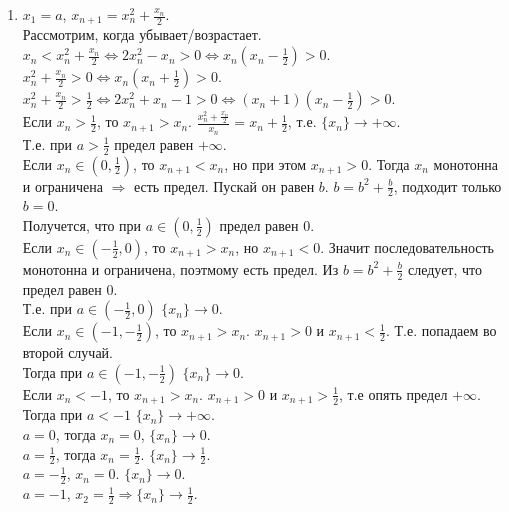 \documentclass[a4paper]{article}
\begin{document}
\begin{enumerate}
    \item $x_1 = a$, $x_{n+1} = x_n^2 + \frac{x_n}{2}$.\\
    Рассмотрим, когда убывает/возрастает.\\
    $x_n < x_n^2 + \frac{x_n}{2} \Leftrightarrow 2x_n^2 - x_n > 0 \Leftrightarrow x_n(x_n - \frac{1}{2}) > 0$.\\
    $x_n^2 + \frac{x_n}{2} > 0 \Leftrightarrow x_n(x_n + \frac{1}{2}) > 0$.\\
    $x_n^2 + \frac{x_n}{2} > \frac{1}{2} \Leftrightarrow 2x_n^2 + x_n - 1 > 0 \Leftrightarrow (x_n + 1)(x_n - \frac{1}{2}) > 0$.\\
    Если $x_n > \frac{1}{2}$, то $x_{n+1} > x_n$. $\frac{x_n^2 + \frac{x_n}{2}}{x_n} = x_n + \frac{1}{2}$, т.е. $\{x_n\} \rightarrow +\infty$. \\
    Т.е. при $a > \frac{1}{2}$ предел равен $+\infty$.\\
    Если $x_n \in (0, \frac{1}{2})$, то $x_{n+1} < x_n$, но при этом $x_{n+1} > 0$. Тогда ${x_n}$ монотонна и ограничена $\Rightarrow$ есть предел. Пускай он равен $b$. $b = b^2 + \frac{b}{2}$, подходит только $b=0$. \\
    Получется, что при $a \in (0, \frac{1}{2})$ предел равен 0.\\
    Если $x_n \in (-\frac{1}{2}, 0)$, то $x_{n+1} > x_n$, но $x_{n+1} < 0$. Значит последовательность монотонна и ограничена, поэтмому есть предел. Из $b = b^2 + \frac{b}{2}$ следует, что предел равен 0.\\ Т.е. при $a \in (-\frac{1}{2}, 0)$ $\{x_n\} \rightarrow 0$.\\
    Если $x_n \in (-1, -\frac{1}{2})$, то $x_{n+1} > x_n$. $x_{n+1} > 0$ и $x_{n+1} < \frac{1}{2}$. Т.е. попадаем во второй случай.\\
    Тогда при $a \in (-1, -\frac{1}{2})$ $\{x_n\}\rightarrow 0$.\\
    Если $x_{n} < -1$, то $x_{n+1} > x_n$. $x_{n+1} > 0$ и $x_{n+1} > \frac{1}{2}$, т.е опять предел $+\infty$. \\
    Тогда при $a < -1$ $\{x_n\}\rightarrow+\infty$.\\
    $a = 0$, тогда $x_n = 0$, $\{x_n\}\rightarrow 0$.\\
    $a = \frac{1}{2}$, тогда $x_n = \frac{1}{2}$. $\{x_n\}\rightarrow\frac{1}{2}$.\\
    $a = -\frac{1}{2}$, $x_n = 0$. $\{x_n\}\rightarrow 0$.\\
    $a = -1$, $x_2 = \frac{1}{2} \Rightarrow \{x_n\}\rightarrow\frac{1}{2}$.\\

\end{enumerate}
\end{document}
